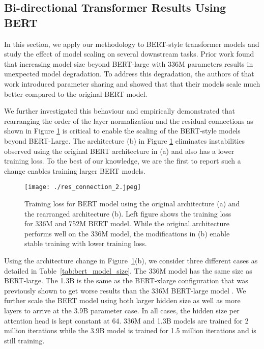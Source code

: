 \documentclass{article}
\begin{document}
\subsection{Bi-directional Transformer Results Using BERT}

In this section, we apply our methodology to BERT-style transformer models and study the effect of model scaling on several downstream tasks. Prior work \cite{ALBERT2019} found that increasing model size beyond BERT-large with 336M parameters results in unexpected model degradation. To address this degradation, the authors of that work \cite{ALBERT2019} introduced parameter sharing and showed that that their models scale much better compared to the original BERT model.

We further investigated this behaviour and empirically demonstrated that rearranging the order of the layer normalization and the residual connections as shown in Figure \ref{fig:bert-residual} is critical to enable the scaling of the BERT-style models beyond BERT-Large. The architecture (b) in Figure \ref{fig:bert-residual} eliminates instabilities observed using the original BERT architecture in (a) and also has a lower training loss. To the best of our knowledge, we are the first to report such a change enables training larger BERT models. 

\begin{figure}
\vspace{-2mm}
\begin{center}
  \texttt{[image: ./res\_connection\_2.jpeg]}
  \vspace{-2mm}
  \caption{Training loss for BERT model using the original architecture (a) and the rearranged architecture (b). Left figure shows the training loss for 336M and 752M BERT model. While the original architecture performs well on the 336M model, the modifications in (b) enable stable training with lower training loss.}
  \label{fig:bert-residual}
\end{center}
\vspace{-6mm}
\end{figure}

Using the architecture change in Figure~\ref{fig:bert-residual}(b), we consider three different cases as detailed in Table~\ref{tab:bert_model_size}. The 336M model has the same size as BERT-large. The 1.3B is the same as the BERT-xlarge configuration that was previously shown to get worse results than the 336M BERT-large model \cite{ALBERT2019}. We further scale the BERT model using both larger hidden size as well as more layers to arrive at the 3.9B parameter case. In all cases, the hidden size per attention head is kept constant at 64. 336M and 1.3B models are trained for 2 million iterations while the 3.9B model is trained for 1.5 million iterations and is still training.
\end{document}

